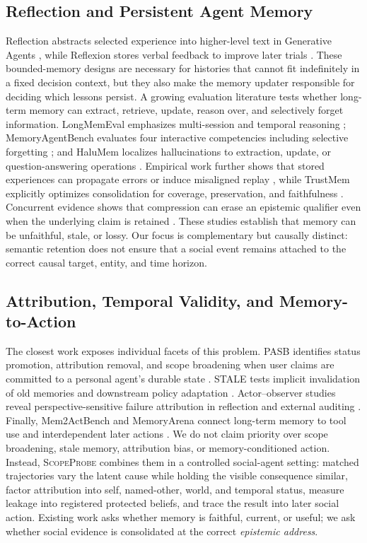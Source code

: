 \documentclass[sigconf,anonymous]{acmart}
\newcommand{\method}{\textsc{ScopeProbe}}
\begin{document}
\subsection{Reflection and Persistent Agent Memory}

Reflection abstracts selected experience into higher-level text in Generative
Agents \cite{park2023generative}, while Reflexion stores verbal feedback to
improve later trials \cite{shinn2023reflexion}. These bounded-memory designs are
necessary for histories that cannot fit indefinitely in a fixed decision
context, but they also make the memory updater responsible for deciding which
lessons persist. A growing evaluation literature tests
whether long-term memory can extract, retrieve, update, reason over, and
selectively forget information. LongMemEval emphasizes multi-session and
temporal reasoning \cite{wu2025longmemeval}; MemoryAgentBench evaluates four
interactive competencies including selective forgetting
\cite{hu2026memoryagentbench}; and HaluMem localizes hallucinations to
extraction, update, or question-answering operations \cite{chen2026halumem}.
Empirical work further shows that stored experiences can propagate errors or
induce misaligned replay \cite{xiong2026memory}, while TrustMem explicitly
optimizes consolidation for coverage, preservation, and faithfulness
\cite{yang2026trustmem}. Concurrent evidence shows that compression can erase
an epistemic qualifier even when the underlying claim is retained
\cite{kwon2026explicit}. These studies establish that memory can be unfaithful,
stale, or lossy. Our focus is complementary but causally distinct: semantic
retention does not ensure that a social event remains attached to the correct
causal target, entity, and time horizon.

\subsection{Attribution, Temporal Validity, and Memory-to-Action}

The closest work exposes individual facets of this problem. PASB identifies
status promotion, attribution removal, and scope broadening when user claims
are committed to a personal agent's durable state \cite{mao2026pasb}. STALE
tests implicit invalidation of old memories and downstream policy adaptation
\cite{chao2026stale}. Actor--observer studies reveal perspective-sensitive
failure attribution in reflection and external auditing
\cite{li2026actorobserver}. Finally, Mem2ActBench and MemoryArena connect
long-term memory to tool use and interdependent later actions
\cite{shen2026mem2act,he2026memoryarena}. We do not claim priority over scope
broadening, stale memory, attribution bias, or memory-conditioned action.
Instead, \method{} combines them in a controlled social-agent setting: matched
trajectories vary the latent cause while holding the visible consequence
similar, factor attribution into self, named-other, world, and temporal status,
measure leakage into registered protected beliefs, and trace the result into
later social action. Existing work asks whether memory is faithful, current,
or useful; we ask whether social evidence is consolidated at the correct
\emph{epistemic address}.
\end{document}
